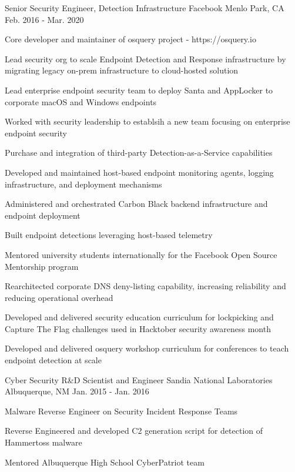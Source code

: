 \begin{cventries}

\cventry
{Senior Security Engineer, Detection Infrastructure} %
{Facebook} %
{Menlo Park, CA} %
{Feb. 2016 - Mar. 2020} %
{ %
\begin{cvitems}
    \item {Core developer and maintainer of osquery project - https://osquery.io}
    \item {Lead security org to scale Endpoint Detection and Response infrastructure by migrating legacy on-prem infrastructure to cloud-hosted solution}
    \item {Lead enterprise endpoint security team to deploy Santa and AppLocker to corporate macOS and Windows endpoints}
    \item {Worked with security leadership to establsih a new team focusing on enterprise endpoint security}
    \item {Purchase and integration of third-party Detection-as-a-Service capabilities}
    \item {Developed and maintained host-based endpoint monitoring agents, logging infrastructure, and deployment mechanisms}
    \item {Administered and orchestrated Carbon Black backend infrastructure and endpoint deployment}
    \item {Built endpoint detections leveraging host-based telemetry}
    \item {Mentored university students internationally for the Facebook Open Source Mentorship program}
    \item {Rearchitected corporate DNS deny-listing capability, increasing reliability and reducing operational overhead}
    \item {Developed and delivered security education curriculum for lockpicking and Capture The Flag challenges used in Hacktober security awareness month}
    \item {Developed and delivered osquery workshop curriculum for conferences to teach endpoint detection at scale}
\end{cvitems}
}


\cventry
{Cyber Security R\&D Scientist and Engineer} %
{Sandia National Laboratories} %
{Albuquerque, NM} %
{Jan. 2015 - Jan. 2016} %
{ %
\begin{cvitems}
    \item {Malware Reverse Engineer on Security Incident Response Teams}
    \item {Reverse Engineered and developed C2 generation script for detection of Hammertoss malware}
    \item {Mentored Albuquerque High School CyberPatriot team}
\end{cvitems}
}


\end{cventries}
